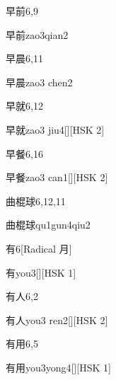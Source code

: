 \begin{entry}{早前}{6,9}
  \begin{phonetics}{早前}{zao3qian2}
  \end{phonetics}
\end{entry}

\begin{entry}{早晨}{6,11}
  \begin{phonetics}{早晨}{zao3 chen2}
  \end{phonetics}
\end{entry}

\begin{entry}{早就}{6,12}
  \begin{phonetics}{早就}{zao3 jiu4}[][HSK 2]
  \end{phonetics}
\end{entry}

\begin{entry}{早餐}{6,16}
  \begin{phonetics}{早餐}{zao3 can1}[][HSK 2]
  \end{phonetics}
\end{entry}

\begin{entry}{曲棍球}{6,12,11}
  \begin{phonetics}{曲棍球}{qu1gun4qiu2}
  \end{phonetics}
\end{entry}

\begin{entry}{有}{6}[Radical 月]
  \begin{phonetics}{有}{you3}[][HSK 1]
  \end{phonetics}
\end{entry}

\begin{entry}{有人}{6,2}
  \begin{phonetics}{有人}{you3 ren2}[][HSK 2]
  \end{phonetics}
\end{entry}

\begin{entry}{有用}{6,5}
  \begin{phonetics}{有用}{you3yong4}[][HSK 1]
  \end{phonetics}
\end{entry}

